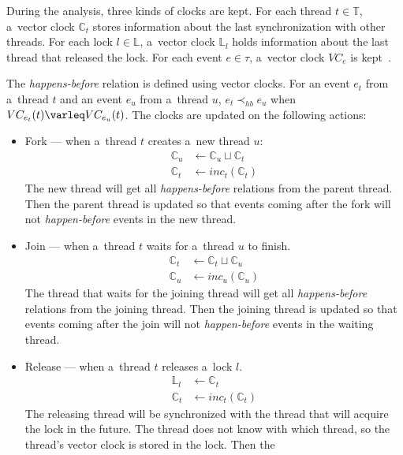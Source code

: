 \medskip
During the analysis, three kinds of clocks are kept. For each thread $t \in
\mathbb{T}$, a~vector clock $\mathbb{C}_t$ stores information about the last
synchronization with other threads. For each lock $l \in \mathbb{L}$, a~vector
clock $\mathbb{L}_l$ holds information about the last thread that released the
lock. For each event $e \in \tau$, a~vector clock $VC_e$ is
kept~\cite{contracts}.

The \emph{happens-before} relation is defined using vector clocks. For an event
$e_t$ from a~thread $t$ and an event $e_u$ from a~thread $u$, $e_t \prec_{hb}
e_u$ when $VC_{e_t}(t) \varleq VC_{e_u}(t)$. The clocks are updated on the
following actions:
\begin{itemize}
    \item Fork --- when a~thread $t$ creates a~new thread $u$:
        \begin{align*}
            \mathbb{C}_u &\leftarrow \mathbb{C}_u \sqcup \mathbb{C}_t \\
            \mathbb{C}_t &\leftarrow inc_t(\mathbb{C}_t)
        \end{align*}
        The new thread will get all \emph{happens-before} relations from the
        parent thread. Then the parent thread is updated so that events coming
        after the fork will not \emph{happen-before} events in the new thread.
    \item Join --- when a~thread $t$ waits for a~thread $u$ to finish.
        \begin{align*}
            \mathbb{C}_t &\leftarrow \mathbb{C}_t \sqcup \mathbb{C}_u \\
            \mathbb{C}_u &\leftarrow inc_u(\mathbb{C}_u)
        \end{align*}
        The thread that waits for the joining thread will get all
        \emph{happens-before} relations from the joining thread. Then the
        joining thread is updated so that events coming after the join will not
        \emph{happen-before} events in the waiting thread.
    \item Release --- when a~thread $t$ releases a~lock $l$.
        \begin{align*}
            \mathbb{L}_l &\leftarrow \mathbb{C}_t \\
            \mathbb{C}_t &\leftarrow inc_t(\mathbb{C}_t)
        \end{align*}
        The releasing thread will be synchronized with the thread that will
        acquire the lock in the future. The thread does not know with which
        thread, so the thread's vector clock is stored in the lock. Then the

\end{itemize}
